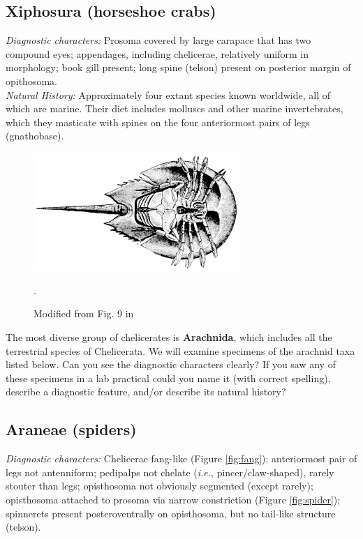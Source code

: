 \documentclass[letterpaper, 11pt]{article}
\begin{document}
\subsection{Xiphosura (horseshoe crabs)}
\noindent{}\textit{Diagnostic characters:} Prosoma covered by large carapace that has two compound eyes; appendages, including chelicerae, relatively uniform in morphology; book gill present; long spine (telson) present on posterior margin of opithosoma. \\

\noindent{}\textit{Natural History:} Approximately four extant species known worldwide, all of which are marine. Their diet includes molluscs and other marine invertebrates, which they masticate with spines on the four anteriormost pairs of legs (gnathobase).\\

\begin{figure}[ht!]
  \centering
    \includegraphics[width=0.7\textwidth]{xiphosura.png}
  \caption{Modified from Fig. 9 in \cite{bhlitem21199comstock}}.
  \label{fig:xipho}
\end{figure}

\noindent{}The most diverse group of chelicerates is \textbf{Arachnida}, which includes all the terrestrial species of Chelicerata. We will examine specimens of the arachnid taxa listed below. Can you see the diagnostic characters clearly? If you saw any of these specimens in a lab practical could you name it (with correct spelling), describe a diagnostic feature, and/or describe its natural history?

\subsection{Araneae (spiders)}
\noindent{}\textit{Diagnostic characters:} Chelicerae fang-like (Figure \ref{fig:fang}); anteriormost pair of legs not antenniform; pedipalps not chelate (\textit{i.e.}, pincer/claw-shaped), rarely stouter than legs; opisthosoma not obviously segmented (except rarely); opisthosoma attached to prosoma via narrow constriction (Figure \ref{fig:spider}); spinnerets present posteroventrally on opisthosoma, but no tail-like structure (telson).\\
\end{document}
